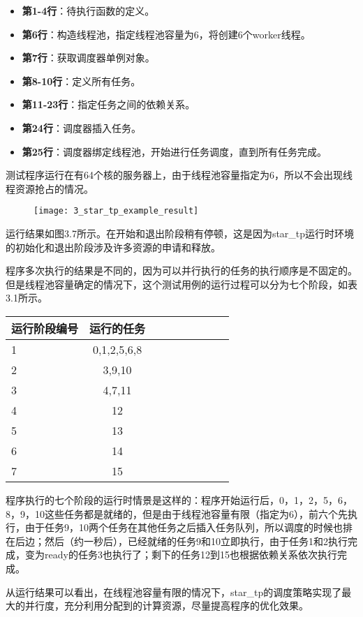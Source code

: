 \begin{itemize}
	\item \textbf{第1-4行}：待执行函数的定义。
	\item \textbf{第6行}：构造线程池，指定线程池容量为6，将创建6个worker线程。
	\item \textbf{第7行}：获取调度器单例对象。
	\item \textbf{第8-10行}：定义所有任务。
	\item \textbf{第11-23行}：指定任务之间的依赖关系。
	\item \textbf{第24行}：调度器插入任务。
	\item \textbf{第25行}：调度器绑定线程池，开始进行任务调度，直到所有任务完成。
\end{itemize}

测试程序运行在有64个核的服务器上，由于线程池容量指定为6，所以不会出现线程资源抢占的情况。

\begin{figure}[!htbp]
    \centering
    \texttt{[image: 3\_star\_tp\_example\_result]}
    \label{fig:3_star_tp_example_result}
\end{figure}

运行结果如图3.7所示。在开始和退出阶段稍有停顿，这是因为star\_tp运行时环境的初始化和退出阶段涉及许多资源的申请和释放。

程序多次执行的结果是不同的，因为可以并行执行的任务的执行顺序是不固定的。但是线程池容量确定的情况下，这个测试用例的运行过程可以分为七个阶段，如表3.1所示。

\begin{table}[!htbp]
    \label{tab:sample}
    \centering
    \footnotesize
    \setlength{\tabcolsep}{4pt}
    \renewcommand{\arraystretch}{1.2} 
    \begin{tabular}{lcccccccc}
        \hline
        运行阶段编号 & 运行的任务 \\
        \hline
        1 & 0,1,2,5,6,8\\
        2 & 3,9,10\\
        3 & 4,7,11\\
        4 & 12\\
        5 & 13\\
        6 & 14\\
        7 & 15\\
        \hline
    \end{tabular}
\end{table}

程序执行的七个阶段的运行时情景是这样的：程序开始运行后，0，1，2，5，6，8，9，10这些任务都是就绪的，但是由于线程池容量有限（指定为6），前六个先执行，由于任务9，10两个任务在其他任务之后插入任务队列，所以调度的时候也排在后边；然后（约一秒后），已经就绪的任务9和10立即执行，由于任务1和2执行完成，变为ready的任务3也执行了；剩下的任务12到15也根据依赖关系依次执行完成。

从运行结果可以看出，在线程池容量有限的情况下，star\_tp的调度策略实现了最大的并行度，充分利用分配到的计算资源，尽量提高程序的优化效果。



